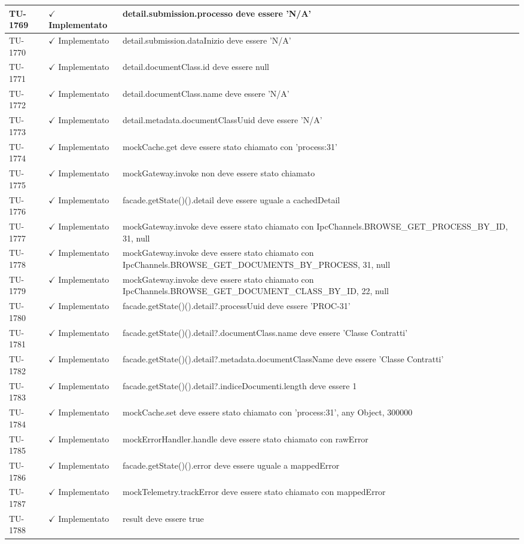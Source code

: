 ﻿\documentclass[a4paper,12pt]{article}
\newcommand{\ok}{\textcolor{green!60!black}{$\checkmark$ Implementato}}
\begin{document}
\begin{longtable}{|p{2cm}|p{3.5cm}|p{9.5cm}|}
\hline
TU-1769 & \ok & detail.submission.processo deve essere 'N/A' \\
\hline
TU-1770 & \ok & detail.submission.dataInizio deve essere 'N/A' \\
\hline
TU-1771 & \ok & detail.documentClass.id deve essere null \\
\hline
TU-1772 & \ok & detail.documentClass.name deve essere 'N/A' \\
\hline
TU-1773 & \ok & detail.metadata.documentClassUuid deve essere 'N/A' \\
\hline
TU-1774 & \ok & mockCache.get deve essere stato chiamato con 'process:31' \\
\hline
TU-1775 & \ok & mockGateway.invoke non deve essere stato chiamato \\
\hline
TU-1776 & \ok & facade.getState()().detail deve essere uguale a cachedDetail \\
\hline
TU-1777 & \ok & mockGateway.invoke deve essere stato chiamato con IpcChannels.BROWSE\_GET\_PROCESS\_BY\_ID, 31, null \\
\hline
TU-1778 & \ok & mockGateway.invoke deve essere stato chiamato con IpcChannels.BROWSE\_GET\_DOCUMENTS\_BY\_PROCESS, 31, null \\
\hline
TU-1779 & \ok & mockGateway.invoke deve essere stato chiamato con IpcChannels.BROWSE\_GET\_DOCUMENT\_CLASS\_BY\_ID, 22, null \\
\hline
TU-1780 & \ok & facade.getState()().detail?.processUuid deve essere 'PROC-31' \\
\hline
TU-1781 & \ok & facade.getState()().detail?.documentClass.name deve essere 'Classe Contratti' \\
\hline
TU-1782 & \ok & facade.getState()().detail?.metadata.documentClassName deve essere 'Classe Contratti' \\
\hline
TU-1783 & \ok & facade.getState()().detail?.indiceDocumenti.length deve essere 1 \\
\hline
TU-1784 & \ok & mockCache.set deve essere stato chiamato con 'process:31', any Object, 300000 \\
\hline
TU-1785 & \ok & mockErrorHandler.handle deve essere stato chiamato con rawError \\
\hline
TU-1786 & \ok & facade.getState()().error deve essere uguale a mappedError \\
\hline
TU-1787 & \ok & mockTelemetry.trackError deve essere stato chiamato con mappedError \\
\hline
TU-1788 & \ok & result deve essere true \\

\end{longtable}
\end{document}

